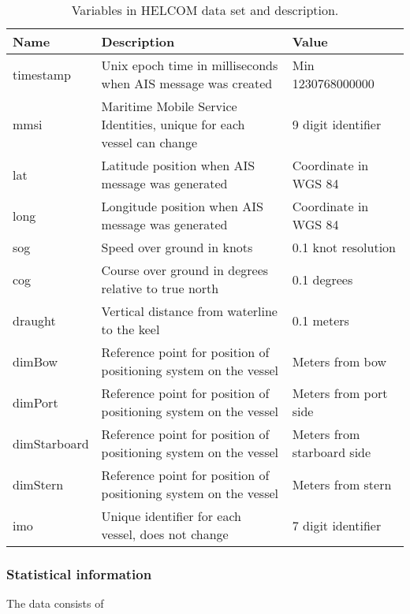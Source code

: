 \documentclass[../main.tex]{subfiles}
\begin{document}
\begin{table}[H]
\centering
\begin{tabular}{|l|m{7cm}|l|}
\hline
\rowcolor[HTML]{C0C0C0}
\textbf{Name} & \textbf{Description}                                                  & \textbf{Value}             \\ \hline
timestamp     & Unix epoch time in milliseconds when AIS message was created          & Min 1230768000000          \\ \hline
mmsi          & Maritime Mobile Service Identities, unique for each vessel can change & 9 digit identifier         \\ \hline
lat           & Latitude position when AIS message was generated                      & Coordinate in WGS 84       \\ \hline
long          & Longitude position when AIS message was generated                     & Coordinate in WGS 84       \\ \hline
sog           & Speed over ground in knots                                            & 0.1 knot resolution        \\ \hline
cog           & Course over ground in degrees relative to true north                  & 0.1 degrees                \\ \hline
draught       & Vertical distance from waterline to the keel                          & 0.1 meters                 \\ \hline
dimBow        & Reference point for position of positioning system on the vessel      & Meters from bow            \\ \hline
dimPort       & Reference point for position of positioning system on the vessel      & Meters from port side      \\ \hline
dimStarboard  & Reference point for position of positioning system on the vessel      & Meters from starboard side \\ \hline
dimStern      & Reference point for position of positioning system on the vessel      & Meters from stern          \\ \hline
imo           & Unique identifier for each vessel, does not change                    & 7 digit identifier         \\ \hline
\end{tabular}
\caption{Variables in HELCOM data set and description.}
\label{tabl:HELCOM-features}
\end{table}

\subsubsection{Statistical information}
\label{sec:AIS-stat}
The data consists of 
\end{document}
